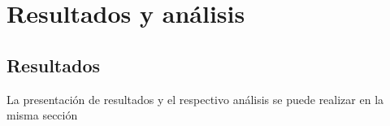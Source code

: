 \chapter{Resultados y análisis}
\section{Resultados}
La presentación de resultados y el respectivo análisis se puede realizar en la misma sección
